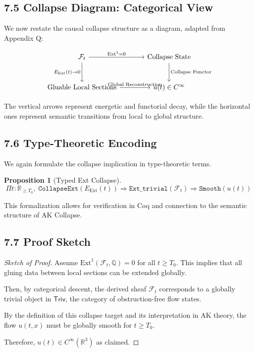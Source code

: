 \documentclass[11pt]{article}
\newtheorem{proposition}[theorem]{Proposition}
\begin{document}
\subsection{7.5 Collapse Diagram: Categorical View}

We now restate the causal collapse structure as a diagram, adapted from Appendix Q:

\[
\begin{tikzcd}[row sep=large, column sep=large]
\mathcal{F}_t
  \arrow[r, "{\mathrm{Ext}^1 = 0}"]
  \arrow[d, "{E_{\mathrm{Ext}}(t) \to 0}"']
& \text{Collapse State}
  \arrow[d, "{\text{Collapse Functor}}"] \\
\text{Gluable Local Sections}
  \arrow[r, "{\text{Global Reconstruction}}"]
& u(t) \in C^\infty
\end{tikzcd}
\]

The vertical arrows represent energetic and functorial decay,  
while the horizontal ones represent semantic transitions from local to global structure.

\subsection{7.6 Type-Theoretic Encoding}

We again formulate the collapse implication in type-theoretic terms.

\begin{proposition}[Typed Ext Collapse]
\[
\Pi t : \mathbb{R}_{\ge T_0},\;
\texttt{CollapseExt}(E_{\mathrm{Ext}}(t)) \Rightarrow
\texttt{Ext\_trivial}(\mathcal{F}_t)
\Rightarrow \texttt{Smooth}(u(t))
\]
\end{proposition}

This formalization allows for verification in Coq and connection to the semantic structure of AK Collapse.

\subsection{7.7 Proof Sketch}

\begin{proof}[Sketch of Proof]
Assume \( \mathrm{Ext}^1(\mathcal{F}_t, \mathbb{Q}) = 0 \) for all \( t \ge T_0 \).  
This implies that all gluing data between local sections can be extended globally.

Then, by categorical descent, the derived sheaf \( \mathcal{F}_t \) corresponds to a globally trivial object in \( \mathsf{Triv} \),  
the category of obstruction-free flow states.

By the definition of this collapse target and its interpretation in AK theory,  
the flow \( u(t,x) \) must be globally smooth for \( t \ge T_0 \).

Therefore, \( u(t) \in C^\infty(\mathbb{R}^3) \) as claimed.
\end{proof}
\end{document}
